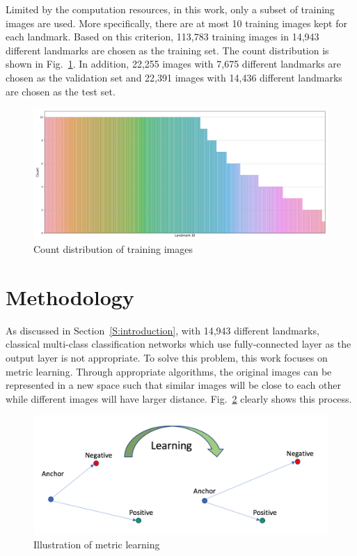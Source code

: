 \documentclass[final,3p]{elsarticle}
\begin{document}
Limited by the computation resources, in this work, only a subset of training images are used. More specifically, there are at most 10 training images kept for each landmark. Based on this criterion, 113,783 training images in 14,943 different landmarks are chosen as the training set. The count distribution is shown in Fig.~\ref{fig:subset_distribution}. In addition, 22,255 images with 7,675 different landmarks are chosen as the validation set and 22,391 images with 14,436 different landmarks are chosen as the test set.

\begin{figure}[hbtp]
\centering\includegraphics[width=1.0\linewidth]{./figures/subset_distribution.png}
\caption{Count distribution of training images}
\label{fig:subset_distribution}
\end{figure}


\section{Methodology}
\label{S:method}

As discussed in Section~\ref{S:introduction}, with 14,943 different landmarks, classical multi-class classification networks which use fully-connected layer as the output layer is not appropriate. To solve this problem, this work focuses on metric learning. Through appropriate algorithms, the original images can be represented in a new space such that similar images will be close to each other while different images will have larger distance. Fig.~\ref{fig:triplet_learning} clearly shows this process.

\begin{figure}[h]
\centering\includegraphics[width=0.8\linewidth]{./figures/learning.png}
\caption{Illustration of metric learning}
\label{fig:triplet_learning}
\end{figure}
\end{document}
